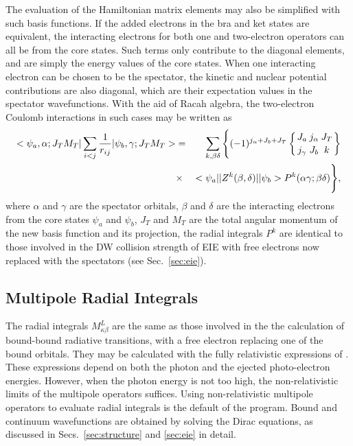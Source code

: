The evaluation of the Hamiltonian matrix elements may also be simplified with
such basis functions. If the added electrons in the bra and ket states are
equivalent, the 
interacting electrons for both one and two-electron operators can all be from
the core states. Such terms only contribute to the diagonal elements, and are
simply the energy values of the core states. When one interacting electron can
be chosen to be the spectator, the kinetic and nuclear potential contributions
are also diagonal, which are their expectation values in the spectator
wavefunctions. With the aid of Racah algebra, the two-electron Coulomb
interactions in such cases may be written as \cite{barshalom:1988a} 
\begin{eqnarray}
<\psi_a,\alpha;J_TM_T|\sum_{i<j}\frac{1}{r_{ij}}|\psi_b,\gamma;J_TM_T>&=&
\sum_{k,\beta\delta}\Bigg\{(-1)^{j_\alpha+J_b+J_T}
\sixj{J_a}{j_\alpha}{J_T}{j_\gamma}{J_b}{k}
\nonumber\\*
&\times&
<\psi_a||Z^k(\beta,\delta)||\psi_b>P^k(\alpha\gamma;\beta\delta)\Bigg\},
\end{eqnarray}
where $\alpha$ and $\gamma$ are the spectator orbitals, $\beta$ and $\delta$
are the interacting electrons from the core states $\psi_a$ and $\psi_b$, $J_T$
and $M_T$ are the total angular momentum of the new basis function and its
projection, 
the radial integrals $P^k$ are identical to those involved in the DW collision
strength of EIE with free electrons now replaced with the spectators
(see Sec.~\ref{sec:eie}).

\subsection{Multipole Radial Integrals}
The radial integrals $M^L_{\kappa\beta}$ are the same as those involved in the
the calculation of bound-bound radiative transitions, with a free electron
replacing one of the bound orbitals. They may be calculated with the fully
relativistic expressions of \citet{grant:1974a}. These expressions depend on
both the photon and the ejected photo-electron energies. However, when the
photon energy is not too high, the non-relativistic limits of the multipole
operators suffices. Using non-relativistic multipole operators to
evaluate radial integrals is the default of the program. 
Bound and continuum wavefunctions are obtained by solving the Dirac equations,
as discussed in Secs.~\ref{sec:structure} and \ref{sec:eie} in detail.

